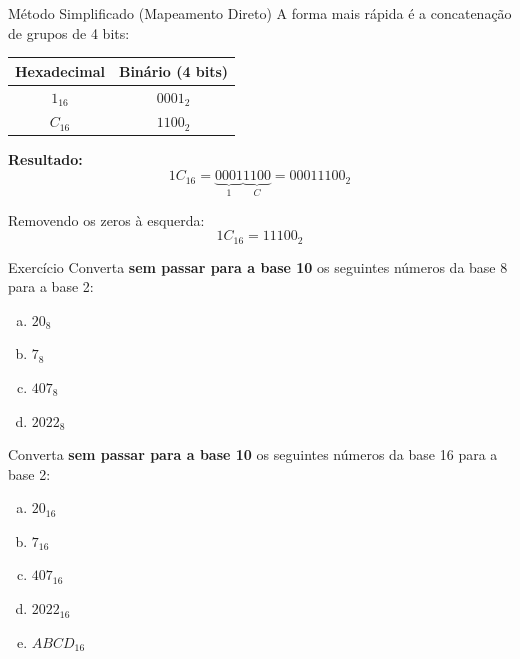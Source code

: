 \begin{frame}{Método Simplificado (Mapeamento Direto)}
    A forma mais rápida é a concatenação de grupos de 4 bits:

    \begin{table}
        \centering
        \begin{tabular}{|c|c|}
            \hline
            \textbf{Hexadecimal} & \textbf{Binário (4 bits)} \\ \hline
            $1_{16}$             & $0001_2$                  \\ \hline
            $C_{16}$             & $1100_2$                  \\ \hline
        \end{tabular}
    \end{table}

    \vspace{0.3cm}
    \textbf{Resultado:}
    \begin{displaymath}
        1C_{16} = \underbrace{0001}_{1} \underbrace{1100}_{C} = 00011100_2
    \end{displaymath}

    \vspace{0.3cm}
    Removendo os zeros à esquerda:
    $$1C_{16} = 11100_2$$
\end{frame}

\begin{frame}{Exercício}
    Converta \textbf{sem passar para a base 10} os seguintes números da base 8 para a base 2:


    \begin{enumerate}[a)]
        \item $20_8$
        \item $7_8$
        \item $407_8$
        \item $2022_8$

    \end{enumerate}

    Converta \textbf{sem passar para a base 10} os seguintes números da base 16 para a base 2:
    \begin{enumerate}[a)]
        \item  $20_{16}$
        \item  $7_{16}$
        \item  $407_{16}$
        \item  $2022_{16}$
        \item  $ABCD_{16}$
    \end{enumerate}
\end{frame}


